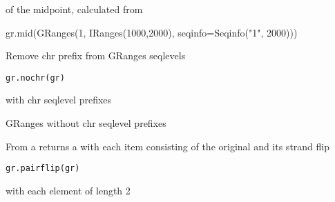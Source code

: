 \documentclass[a4paper]{book}
\begin{document}
%
\begin{Value}
 of the midpoint, calculated from 
\end{Value}
%
\begin{Examples}
\begin{ExampleCode}
gr.mid(GRanges(1, IRanges(1000,2000), seqinfo=Seqinfo("1", 2000)))
\end{ExampleCode}
\end{Examples}
%
\begin{Description}\relax
Remove chr prefix from GRanges seqlevels
\end{Description}
%
\begin{Usage}
\begin{verbatim}
gr.nochr(gr)
\end{verbatim}
\end{Usage}
%
\begin{Arguments}
\begin{ldescription}
\item[\code{gr}]  with chr seqlevel prefixes
\end{ldescription}
\end{Arguments}
%
\begin{Value}
GRanges without chr seqlevel prefixes
\end{Value}
%
\begin{Description}\relax
From a  returns a  with each item consisting
of the original  and its strand flip
\end{Description}
%
\begin{Usage}
\begin{verbatim}
gr.pairflip(gr)
\end{verbatim}
\end{Usage}
%
\begin{Arguments}
\begin{ldescription}
\item[\code{gr}] 
\end{ldescription}
\end{Arguments}
%
\begin{Value}
 with each element of length 2
\end{Value}
\end{document}
